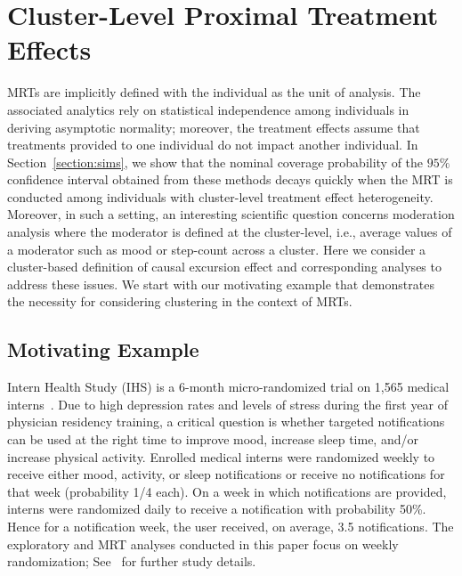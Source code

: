 \documentclass[12pt]{article}
\newcommand{\zw}[1]{\textcolor{blue}{[\textit{ZW: #1}]}}
\begin{document}
\section{Cluster-Level Proximal Treatment Effects}
\label{section:cond_effects}

MRTs are implicitly defined with the individual as the unit of analysis.  The associated analytics rely on statistical independence among individuals in deriving asymptotic normality; moreover, the treatment effects assume that treatments provided to one individual do not impact another individual. In Section~\ref{section:sims}, we show that the nominal coverage probability of the $95\%$ confidence interval obtained from these methods decays quickly when the MRT is conducted among individuals with cluster-level treatment effect heterogeneity.  Moreover, in such a setting, an interesting scientific question concerns moderation analysis where the moderator is defined at the cluster-level, i.e., average values of a moderator such as mood or step-count across a cluster.
Here we consider a cluster-based definition of causal excursion effect and corresponding analyses to address these issues. We start with our motivating example that demonstrates the necessity for considering clustering in the context of MRTs.

\subsection{Motivating Example}
\label{section:motex}

Intern Health Study (IHS) is a 6-month micro-randomized trial on 1,565 medical interns~\citep{Necamp2020}.  Due to high depression rates and levels of stress during the first year of physician residency training, a critical question is whether targeted notifications can be used at the right time to improve mood, increase sleep time, and/or increase physical activity. Enrolled medical interns were randomized weekly to receive either mood, activity, or sleep notifications or receive no notifications for that week (probability 1/4 each).  On a week in which notifications are provided, interns were randomized daily to receive a notification with probability 50\%. Hence for a notification week, the user received, on average, 3.5 notifications. The exploratory and MRT analyses conducted in this paper focus on weekly randomization; See~\cite{Necamp2020} for further study details.
\end{document}
